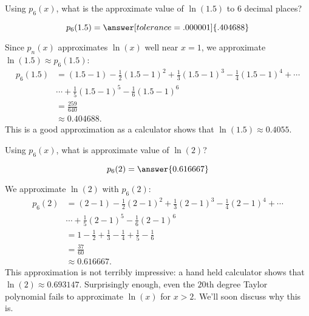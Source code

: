 \documentclass{ximera}
\begin{document}
\begin{question}
  Using $p_6(x)$, what is the approximate value of $\ln(1.5)$ to 6 decimal places?
  \begin{prompt}
    \[
    p_6(1.5) = \answer[tolerance=.000001]{.404688}
    \]
  \end{prompt}
  \begin{hint}
    Since $p_n(x)$ approximates $\ln(x)$ well near $x=1$, we approximate
    $\ln(1.5) \approx p_6(1.5)$:
    \begin{align*}
      p_6(1.5) &= (1.5-1)-\frac12(1.5-1)^2+\frac13(1.5-1)^3-\frac14(1.5-1)^4+\cdots \\
      &\cdots +\frac15(1.5-1)^5-\frac16(1.5-1)^6\\
      &=\frac{259}{640}\\
      &\approx 0.404688.
    \end{align*}
    This is a good approximation as a calculator shows that $\ln(1.5)
    \approx 0.4055.$
  \end{hint}
  \begin{question}
    Using $p_6(x)$, what is approximate value of $\ln(2)$?
    \begin{prompt} 
      \[
      p_6(2) = \answer{0.616667}
      \]
    \end{prompt}
    \begin{hint}
      We approximate $\ln(2)$ with $ p_6(2)$:
      \begin{align*}
        p_6(2) &= (2-1)-\frac12(2-1)^2+\frac13(2-1)^3-\frac14(2-1)^4+\cdots \\
        &\cdots +\frac15(2-1)^5-\frac16(2-1)^6\\
        &=	1-\frac12+\frac13-\frac14+\frac15-\frac16 \\
        &= \frac{37}{60}\\ 
        &\approx 0.616667.
      \end{align*}
      This approximation is not terribly impressive: a hand held
      calculator shows that $\ln(2) \approx 0.693147$. Surprisingly
      enough, even the $20$th degree Taylor polynomial fails to
      approximate $\ln(x)$ for $x>2$. We'll soon discuss why this is.
    \end{hint}
  \end{question}
\end{question}
\end{document}
